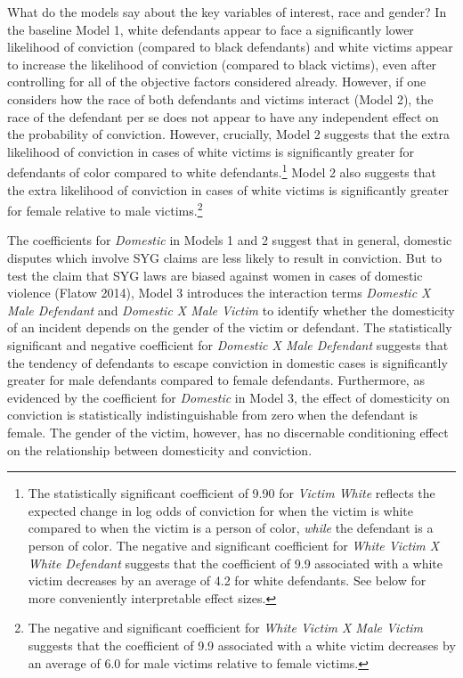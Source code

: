 \documentclass[12pt,article]{article}
\begin{document}
What do the models say about the key variables of interest, race and
gender? In the baseline Model 1, white defendants appear to face a
significantly lower likelihood of conviction (compared to black
defendants) and white victims appear to increase the likelihood of
conviction (compared to black victims), even after controlling for all
of the objective factors considered already. However, if one considers
how the race of both defendants and victims interact (Model 2), the race
of the defendant per se does not appear to have any independent effect
on the probability of conviction. However, crucially, Model 2 suggests
that the extra likelihood of conviction in cases of white victims is
significantly greater for defendants of color compared to white
defendants.\footnote{The statistically significant coefficient of 9.90
  for \emph{Victim White} reflects the expected change in log odds of
  conviction for when the victim is white compared to when the victim is
  a person of color, \emph{while} the defendant is a person of color.
  The negative and significant coefficient for \emph{White Victim X
  White Defendant} suggests that the coefficient of 9.9 associated with
  a white victim decreases by an average of 4.2 for white defendants.
  See below for more conveniently interpretable effect sizes.} Model 2
also suggests that the extra likelihood of conviction in cases of white
victims is significantly greater for female relative to male
victims.\footnote{The negative and significant coefficient for
  \emph{White Victim X Male Victim} suggests that the coefficient of 9.9
  associated with a white victim decreases by an average of 6.0 for male
  victims relative to female victims.}

The coefficients for \emph{Domestic} in Models 1 and 2 suggest that in
general, domestic disputes which involve SYG claims are less likely to
result in conviction. But to test the claim that SYG laws are biased
against women in cases of domestic violence (Flatow 2014), Model 3
introduces the interaction terms \emph{Domestic X Male Defendant} and
\emph{Domestic X Male Victim} to identify whether the domesticity of an
incident depends on the gender of the victim or defendant. The
statistically significant and negative coefficient for \emph{Domestic X
Male Defendant} suggests that the tendency of defendants to escape
conviction in domestic cases is significantly greater for male
defendants compared to female defendants. Furthermore, as evidenced by
the coefficient for \emph{Domestic} in Model 3, the effect of
domesticity on conviction is statistically indistinguishable from zero
when the defendant is female. The gender of the victim, however, has no
discernable conditioning effect on the relationship between domesticity
and conviction.
\end{document}
